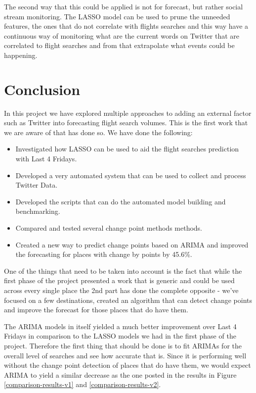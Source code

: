 \documentclass[minf,twoside,singlespacing,parskip,frontabs,notimes,12pt]{infthesis} %
\begin{document}
The second way that this could be applied is not for forecast, but rather social stream monitoring. The LASSO model can be used to prune the unneeded features, the ones that do not correlate with flights searches and this way have a continuous way of monitoring what are the current words on Twitter that are correlated to flight searches and from that extrapolate what events could be happening.

\section{Conclusion}

In this project we have explored multiple approaches to adding an external factor such as Twitter into forecasting flight search volumes. This is the first work that we are aware of that has done so. We have done the following:

\begin{itemize}
\item Investigated how LASSO can be used to aid the flight searches prediction with Last 4 Fridays.
\item Developed a very automated system that can be used to collect and process Twitter Data.
\item Developed the scripts that can do the automated model building and benchmarking. 
\item Compared and tested several change point methods methods.
\item Created a new way to predict change points based on ARIMA and improved the forecasting for places with change by points by 45.6\%.
\end{itemize}

One of the things that need to be taken into account is the fact that while the first phase of the project presented a work that is generic and could be used across every single place the 2nd part has done the complete opposite - we've focused on a few destinations, created an algorithm that can detect change points and improve the forecast for those places that do have them.

The ARIMA models in itself yielded a much better improvement over Last 4 Fridays in comparison to the LASSO models we had in the first phase of the project. Therefore the first thing that should be done is to fit ARIMAs for the overall level of searches and see how accurate that is. Since it is performing well without the change point detection of places that do have them, we would expect ARIMA to yield a similar decrease as the one posted in the results in Figure \ref{comparison-results-v1} and \ref{comparison-results-v2}. 
\end{document}
